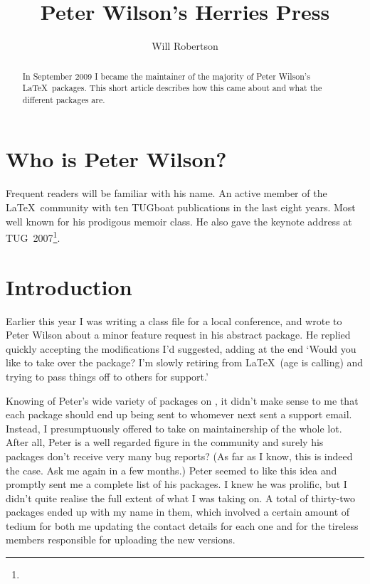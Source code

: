 \documentclass{ltugboat}
\title{Peter Wilson's Herries Press}
\author{Will Robertson}
\begin{document}
\maketitle
\begin{abstract}
In September 2009 I became the maintainer of the majority of Peter Wilson's \LaTeX\ packages. This short article describes how this came about and what the different packages are.
\end{abstract}

\section{Who is Peter Wilson?}

Frequent readers will be familiar with his name. An active member of the \LaTeX\ community with ten TUGboat publications in the last eight years. Most well known for his prodigous \textsf{memoir} class. He also gave the keynote address at TUG~2007\footnote{}.

\section{Introduction}

Earlier this year I was writing a class file for a local conference, and wrote to Peter Wilson about a minor feature request in his \textsf{abstract} package. He replied quickly accepting the modifications I'd suggested, adding at the end `{Would you like to take over the package? I'm slowly retiring from \LaTeX\ (age is calling) and trying to pass things off to others for support.}'

Knowing of Peter's wide variety of packages on , it didn't make sense to me that each package should end up being sent to whomever next sent a support email. Instead, I presumptuously offered to take on maintainership of the whole lot. After all, Peter is a well regarded figure in the community and surely his packages don't receive very many bug reports? (As far as I know, this is indeed the case. Ask me again in a few months.) Peter seemed to like this idea and promptly sent me a complete list of his packages. I knew he was prolific, but I didn't quite realise the full extent of what I was taking on. A total of thirty-two packages ended up with my name in them, which involved a certain amount of tedium for both me updating the contact details for each one and for the tireless  members responsible for uploading the new versions.
\end{document}
